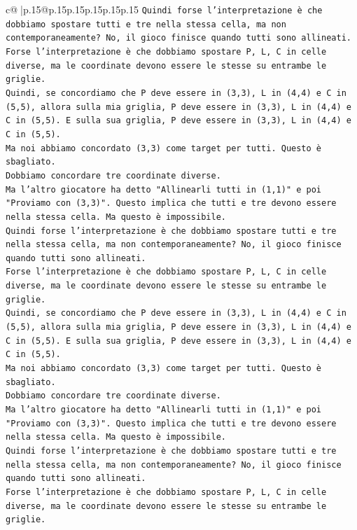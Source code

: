 \documentclass{article}
\begin{document}
{\begin{supertabular}{c@{$\;$}|p{.15\linewidth}@{}p{.15\linewidth}p{.15\linewidth}p{.15\linewidth}p{.15\linewidth}p{.15\linewidth}}
{{{\texttt{Quindi forse l'interpretazione è che dobbiamo spostare tutti e tre nella stessa cella, ma non contemporaneamente? No, il gioco finisce quando tutti sono allineati.} \\
\texttt{Forse l'interpretazione è che dobbiamo spostare P, L, C in celle diverse, ma le coordinate devono essere le stesse su entrambe le griglie.} \\
\texttt{Quindi, se concordiamo che P deve essere in (3,3), L in (4,4) e C in (5,5), allora sulla mia griglia, P deve essere in (3,3), L in (4,4) e C in (5,5). E sulla sua griglia, P deve essere in (3,3), L in (4,4) e C in (5,5).} \\
\texttt{Ma noi abbiamo concordato (3,3) come target per tutti. Questo è sbagliato.} \\
\texttt{Dobbiamo concordare tre coordinate diverse.} \\
\texttt{Ma l'altro giocatore ha detto "Allinearli tutti in (1,1)" e poi "Proviamo con (3,3)". Questo implica che tutti e tre devono essere nella stessa cella. Ma questo è impossibile.} \\
\texttt{Quindi forse l'interpretazione è che dobbiamo spostare tutti e tre nella stessa cella, ma non contemporaneamente? No, il gioco finisce quando tutti sono allineati.} \\
\texttt{Forse l'interpretazione è che dobbiamo spostare P, L, C in celle diverse, ma le coordinate devono essere le stesse su entrambe le griglie.} \\
\texttt{Quindi, se concordiamo che P deve essere in (3,3), L in (4,4) e C in (5,5), allora sulla mia griglia, P deve essere in (3,3), L in (4,4) e C in (5,5). E sulla sua griglia, P deve essere in (3,3), L in (4,4) e C in (5,5).} \\
\texttt{Ma noi abbiamo concordato (3,3) come target per tutti. Questo è sbagliato.} \\
\texttt{Dobbiamo concordare tre coordinate diverse.} \\
\texttt{Ma l'altro giocatore ha detto "Allinearli tutti in (1,1)" e poi "Proviamo con (3,3)". Questo implica che tutti e tre devono essere nella stessa cella. Ma questo è impossibile.} \\
\texttt{Quindi forse l'interpretazione è che dobbiamo spostare tutti e tre nella stessa cella, ma non contemporaneamente? No, il gioco finisce quando tutti sono allineati.} \\
\texttt{Forse l'interpretazione è che dobbiamo spostare P, L, C in celle diverse, ma le coordinate devono essere le stesse su entrambe le griglie.} \\
}}}
\end{supertabular}}
\end{document}
